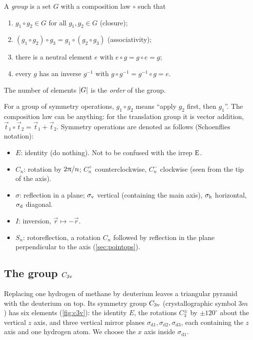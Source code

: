 \begin{definition}
A \emph{group} is a set $G$ with a composition law $\circ$ such that
\begin{enumerate}
\item $g_1\circ g_2\in G$ for all $g_1,g_2\in G$ (closure);
\item $(g_1\circ g_2)\circ g_3=g_1\circ(g_2\circ g_3)$ (associativity);
\item there is a neutral element $e$ with $e\circ g=g\circ e=g$;
\item every $g$ has an inverse $g^{-1}$ with $g\circ g^{-1}=g^{-1}\circ g=e$.
\end{enumerate}
The number of elements $\lvert G\rvert$ is the \emph{order} of the group.
\end{definition}
For a group of symmetry operations, $g_1\circ g_2$ means ``apply $g_2$ first, then
$g_1$''. The composition law can be anything: for the translation group it is vector
addition, $\vec{t}_1\circ\vec{t}_2=\vec{t}_1+\vec{t}_2$. Symmetry operations are
denoted as follows (Schoenflies notation):
\begin{itemize}
\item $E$: identity (do nothing). Not to be confused with the irrep $\mathrm{E}$.
\item $C_n$: rotation by $2\uppi/n$; $C_n^{+}$ counterclockwise, $C_n^{-}$ clockwise
      (seen from the tip of the axis).
\item $\sigma$: reflection in a plane; $\sigma_{\mathrm{v}}$ vertical (containing the main axis),
      $\sigma_{\mathrm{h}}$ horizontal, $\sigma_{\mathrm{d}}$ diagonal.
\item $I$: inversion, $\vec{r}\mapsto-\vec{r}$.
\item $S_n$: rotoreflection, a rotation $C_n$ followed by reflection in the plane
      perpendicular to the axis (\cref{sec:pointops}).
\end{itemize}

\subsection{The group \texorpdfstring{$C_{3\mathrm{v}}$}{C3v}}

Replacing one hydrogen of methane by deuterium leaves a triangular pyramid with the
deuterium on top. Its symmetry group $C_{3\mathrm{v}}$ (crystallographic symbol $3m$) has six
elements (\cref{fig:c3v}): the identity $E$, the rotations $C_3^{\pm}$ by
$\pm120^\circ$ about the vertical $z$ axis, and three vertical mirror planes
$\sigma_{\mathrm{d}1},\sigma_{\mathrm{d}2},\sigma_{\mathrm{d}3}$, each containing the
$z$ axis and one hydrogen atom. We choose the $x$ axis inside
$\sigma_{\mathrm{d}1}$.

